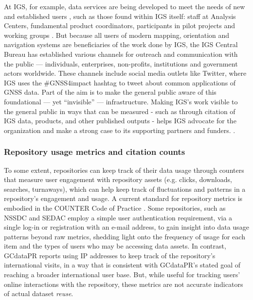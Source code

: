 \documentclass{interact}
\begin{document}
At IGS, for example, data services are being developed to meet the needs of new and established users \parencite{ventura-traveset_gssc_2019}, such as those found within IGS itself: staff at Analysis Centers, fundamental product coordinators, participants in pilot projects and working groups \parencite[139]{villiger_international_2019}. But because all users of modern mapping, orientation and navigation systems are beneficiaries of the work done by IGS, the IGS Central Bureau has established various channels for outreach and communication \parencite[22]{villiger_international_2019} with the public — individuals, enterprises, non-profits, institutions and government actors worldwide. These channels include social media outlets like Twitter, where IGS uses the \#GNSS4impact hashtag to tweet about common applications of GNSS data. Part of the aim is to make the general public aware of this foundational — yet “invisible” — infrastructure. Making IGS’s work visible to the general public in ways that can be measured - such as through citation of IGS data, products, and other published outputs - helps IGS advocate for the organization and make a strong case to its supporting partners and funders. \parencite{igs_central_bureau_igs_2018}.

\subsubsection{Repository usage metrics and citation counts}
To some extent, repositories can keep track of their data usage through counters that measure user engagement with repository assets (e.g. clicks, downloads, searches, turnaways), which can help keep track of fluctuations and patterns in a repository’s engagement and usage. A current standard for repository metrics is embodied in the COUNTER Code of Practice \parencite{counter_code_2019}. Some repositories, such as NSSDC and SEDAC employ a simple user authentication requirement, via a single log-in or registration with an e-mail address, to gain insight into data usage patterns beyond raw metrics, shedding light onto the frequency of usage for each item and the types of users who may be accessing data assets. In contrast, GCdataPR reports using IP addresses to keep track of the repository’s international visits, in a way that is consistent with GCdataPR's stated goal of reaching a broader international user base. But, while useful for tracking users' online interactions with the repository, these metrics are not accurate indicators of actual dataset \emph{reuse}. 
\end{document}
